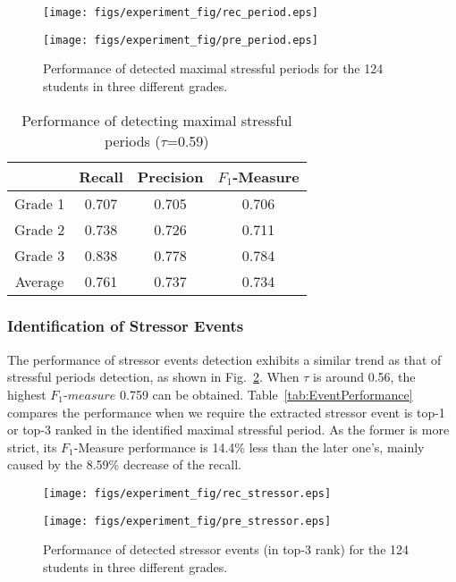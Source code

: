\begin{figure}
\begin{minipage}{0.4\linewidth}
        \texttt{[image: figs/experiment\_fig/rec\_period.eps]}
\end{minipage}
\begin{minipage}{0.6\linewidth}
    \texttt{[image: figs/experiment\_fig/pre\_period.eps]}
 \end{minipage}
\caption{Performance of detected maximal stressful periods for the 124 students in three different grades.}
\label{fig:res_period}
\end{figure}

\begin{table}
\begin{center}
\caption{Performance of detecting maximal stressful periods ($\tau$=0.59)}
\begin{tabular}{|c|c|c|c|} \hline
& \textbf{Recall} & \textbf{Precision} & \textbf{$F_1$-Measure} \\ \hline
Grade 1 & 0.707 &0.705&0.706\\ \hline
Grade 2 & 0.738 &0.726&0.711\\ \hline
Grade 3 & 0.838 &0.778 &0.784\\ \hline
Average & 0.761 &0.737 &0.734\\ \hline
\end{tabular}
\label{tab:PeriodPerformance}
\end{center}
\end{table}

\subsubsection{Identification of Stressor Events}

The performance of stressor events detection exhibits a similar trend as that of stressful periods detection, as shown in
Fig.~\ref{fig:res_stressor}.
When $\tau$ is around 0.56, the highest $F_1$-$measure$ 0.759 can be obtained.
Table~\ref{tab:EventPerformance} compares the performance when we require the extracted stressor event is top-1 or top-3 ranked
in the identified maximal stressful period.
As the former is more strict, its $F_1$-Measure performance is 14.4\% less than the later one's,
mainly caused by the 8.59\% decrease of the recall.

\begin{figure}
\begin{minipage}{0.4\linewidth}
        \texttt{[image: figs/experiment\_fig/rec\_stressor.eps]}
\end{minipage}
\begin{minipage}{0.5\linewidth}
    \texttt{[image: figs/experiment\_fig/pre\_stressor.eps]}
 \end{minipage}
\caption{Performance of detected stressor events (in top-3 rank) for the 124 students in three different grades.}
\label{fig:res_stressor}
\end{figure}


